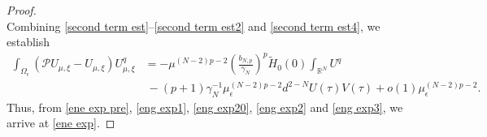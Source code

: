 \documentclass[reqno]{amsart}
\theoremstyle{remark}
\newcommand{\ep}{\epsilon}
\newcommand{\ga}{\gamma}
\newcommand{\R}{\mathbb{R}}
\newcommand{\mcp}{\mathcal{P}}
\newcommand{\wth}{\widetilde{H}}
\newcommand{\mx}{{\mu,\xi}}
\renewcommand{\(}{\left(}
\renewcommand{\)}{\right)}
\numberwithin{equation}{section}
\begin{document}
\begin{proof}
\begin{equation}
\end{equation}
Combining \eqref{second term est}--\eqref{second term est2} and \eqref{second term est4}, we establish
\begin{equation}\label{eng exp3}
\begin{aligned}
\int_{\Omega_\ep} (\mcp U_\mx-U_\mx)U_\mx^q &=- \mu^{(N-2)p-2} \(\frac{b_{N,p}}{\ga_N}\)^p \wth_0(0)\int_{\R^N}U^q \\
&\ - (p+1)\ga_N^{-1} \mu_\ep^{(N-2)p-2}d^{2-N} U(\tau)V(\tau) + o(1)\mu_\ep^{(N-2)p-2}.
\end{aligned}
\end{equation}
Thus, from \eqref{ene exp pre}, \eqref{eng exp1}, \eqref{eng exp20}, \eqref{eng exp2} and \eqref{eng exp3}, we arrive at \eqref{ene exp}.
\end{proof}
\end{document}
